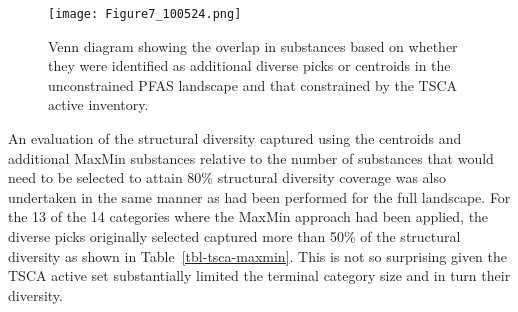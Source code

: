 \documentclass[
  super,
  preprint,
  3p]{elsarticle}
\begin{document}
\begin{figure}

{\centering \texttt{[image: Figure7\_100524.png]}

}

\caption{\label{fig-venn}Venn diagram showing the overlap in substances
based on whether they were identified as additional diverse picks or
centroids in the unconstrained PFAS landscape and that constrained by
the TSCA active inventory.}

\end{figure}

An evaluation of the structural diversity captured using the centroids
and additional MaxMin substances relative to the number of substances
that would need to be selected to attain 80\% structural diversity
coverage was also undertaken in the same manner as had been performed
for the full landscape. For the 13 of the 14 categories where the MaxMin
approach had been applied, the diverse picks originally selected
captured more than 50\% of the structural diversity as shown in
Table~\ref{tbl-tsca-maxmin}. This is not so surprising given the TSCA
active set substantially limited the terminal category size and in turn
their diversity.
\end{document}
